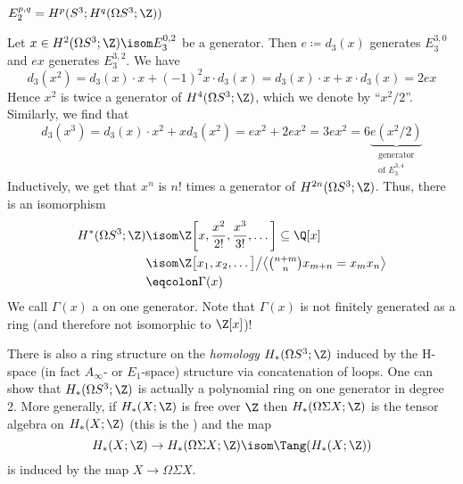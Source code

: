 \begin{example}
\begin{center}
 \\
		$E_2^{p, q} = H^p(S^3; H^q(\Omega S^3; \Z))$ 
	\end{center}
	Let $x \in H^2(\Omega S^3; \Z) \isom E_3^{0, 2}$ be a generator.
	Then $e \coloneq d_3(x)$ generates $E_3^{3, 0}$ and $ex$ generates $E_3^{3, 2}$.
	We have 
	\begin{equation*}
		d_3(x^2) = d_3(x) \cdot x + (-1)^2 x \cdot d_3(x) = d_3(x) \cdot x + x \cdot d_3(x) = 2ex
	\end{equation*}
	Hence $x^2$ is twice a generator of $H^4(\Omega S^3; \Z)$, which we denote by \enquote{$x^2 / 2$}.
	Similarly, we find that
	\begin{equation*}
		d_3(x^3) = d_3(x) \cdot x^2 + x d_3(x^2) = ex^2 + 2ex^2 = 3ex^2 = 6 \underbrace{e (x^2 / 2)}_{\substack{\text{generator} \\ \text{of } E_3^{3, 4}}}
	\end{equation*}
	Inductively, we get that $x^n$ is $n!$ times a generator of $H^{2n}(\Omega S^3; \Z)$.
	Thus, there is an isomorphism
	\begin{align*}
		H^*(\Omega S^3; \Z) &\isom \Z\bigg[x, \frac{x^2}{2!}, \frac{x^3}{3!}, \ldots\bigg] \subseteq \Q[x] \\
							&\isom \Z\big[x_1, x_2, \ldots\big] \big/ \big\langle {\textstyle\binom{n + m}{n}} x_{m + n} = x_m x_n \big\rangle \\
							&\eqcolon \Gamma(x)
	\end{align*}
	We call $\Gamma(x)$ a  on one generator.
	Note that $\Gamma(x)$ is not finitely generated as a ring (and therefore not isomorphic to $\Z[x]$)!
\end{example}
\begin{remark}
	There is also a ring structure on the \emph{homology} $H_*(\Omega S^3; \Z)$ induced by the H-space (in fact $A_\infty$- or $E_1$-space) structure via concatenation of loops.
	One can show that $H_*(\Omega S^3; \Z)$ is actually a polynomial ring on one generator in degree 2.
	More generally, if $H_*(X; \Z)$ is free over $\Z$ then $H_*(\Omega \Sigma X; \Z)$ is the tensor algebra on $H_*(X; \Z)$ (this is the ) and the map
	\begin{equation*}
		H_*(X; \Z) \to H_*(\Omega \Sigma X; \Z) \isom \Tang(H_*(X; \Z))
	\end{equation*} 
	is induced by the map $X \to \Omega \Sigma X$.
\end{remark}
